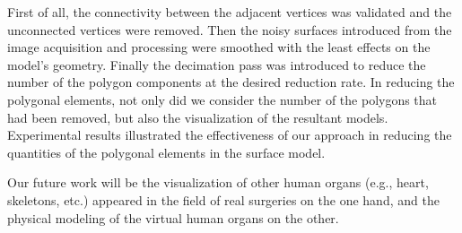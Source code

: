 First of all, the connectivity between the adjacent vertices was validated and the unconnected vertices were removed.
Then the noisy surfaces introduced from the image acquisition and processing were smoothed with the least effects on the model's geometry.
Finally the decimation pass was introduced to reduce the number of the polygon components at the desired reduction rate.
In reducing the polygonal elements, not only did we consider the number of the polygons that had been removed, but also the visualization of the resultant models.
Experimental results illustrated the effectiveness of our approach in reducing the quantities of the polygonal elements in the surface model.

Our future work will be the visualization of other human organs (e.g., heart, skeletons, etc.) appeared in the field of real surgeries on the one hand, and the physical modeling of the virtual human organs on the other. %
